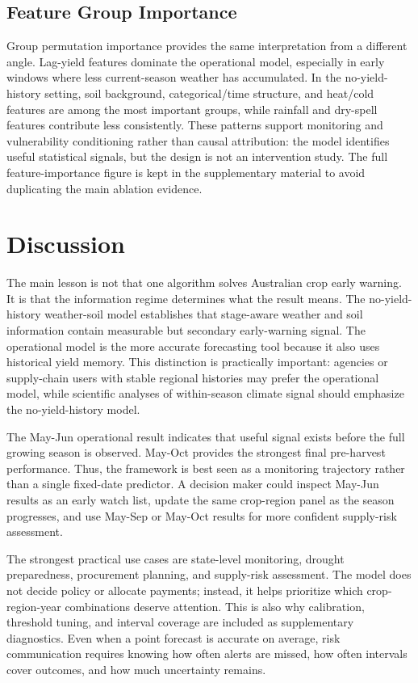 \documentclass[wcp]{jmlr}
\begin{document}
\subsection{Feature Group Importance}

Group permutation importance provides the same interpretation from a different angle. Lag-yield features dominate the operational model, especially in early windows where less current-season weather has accumulated. In the no-yield-history setting, soil background, categorical/time structure, and heat/cold features are among the most important groups, while rainfall and dry-spell features contribute less consistently. These patterns support monitoring and vulnerability conditioning rather than causal attribution: the model identifies useful statistical signals, but the design is not an intervention study. The full feature-importance figure is kept in the supplementary material to avoid duplicating the main ablation evidence.

\section{Discussion}

The main lesson is not that one algorithm solves Australian crop early warning. It is that the information regime determines what the result means. The no-yield-history weather-soil model establishes that stage-aware weather and soil information contain measurable but secondary early-warning signal. The operational model is the more accurate forecasting tool because it also uses historical yield memory. This distinction is practically important: agencies or supply-chain users with stable regional histories may prefer the operational model, while scientific analyses of within-season climate signal should emphasize the no-yield-history model.

The May-Jun operational result indicates that useful signal exists before the full growing season is observed. May-Oct provides the strongest final pre-harvest performance. Thus, the framework is best seen as a monitoring trajectory rather than a single fixed-date predictor. A decision maker could inspect May-Jun results as an early watch list, update the same crop-region panel as the season progresses, and use May-Sep or May-Oct results for more confident supply-risk assessment.

The strongest practical use cases are state-level monitoring, drought preparedness, procurement planning, and supply-risk assessment. The model does not decide policy or allocate payments; instead, it helps prioritize which crop-region-year combinations deserve attention. This is also why calibration, threshold tuning, and interval coverage are included as supplementary diagnostics. Even when a point forecast is accurate on average, risk communication requires knowing how often alerts are missed, how often intervals cover outcomes, and how much uncertainty remains.
\end{document}
